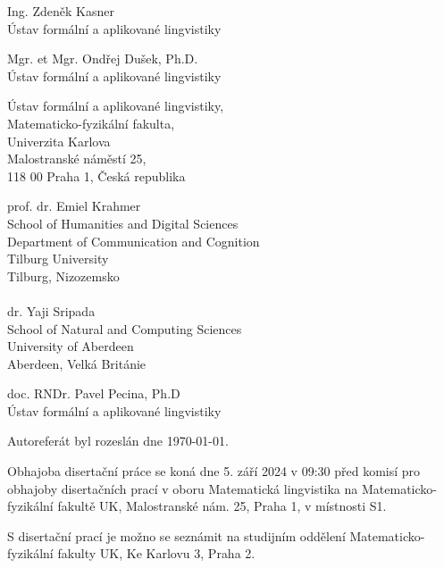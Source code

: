 \documentclass[12pt,notitlepage,a4paper,openright]{report}
\begin{document}
\begin{description}[leftmargin=15.5em,labelwidth=15.5em,labelindent=0em,labelsep=0em]
  \item[Doktorand:] Ing. Zdeněk Kasner\\Ústav formální a aplikované lingvistiky
  \item[Školitel:] Mgr. et Mgr. Ondřej Dušek, Ph.D.\\Ústav formální a aplikované lingvistiky
  \item[Školicí pracoviště:]  Ústav formální a aplikované lingvistiky,
    \\Matematicko-fyzikální fakulta,
    \\Univerzita Karlova
    \\Malostranské náměstí 25,
    \\118 00 Praha 1, Česká republika

  \item[Oponenti:] prof. dr. Emiel Krahmer\\School of Humanities and Digital Sciences\\Department of Communication and Cognition\\Tilburg University\\Tilburg, Nizozemsko\\ \\ dr. Yaji Sripada\\ School of Natural and Computing Sciences\\University of Aberdeen\\Aberdeen, Velká Británie

  \item[Předseda RDSO:] doc. RNDr. Pavel Pecina, Ph.D\\Ústav formální a aplikované lingvistiky
\end{description}

\vfill

\noindent Autoreferát byl rozeslán dne \today.

\vspace{0.5cm}

\noindent Obhajoba disertační práce se koná dne 5. září 2024 v 09:30 před komisí pro obhajoby disertačních prací v oboru Matematická lingvistika na Matematicko-fyzikální fakultě UK, Malostranské nám. 25, Praha 1, v místnosti S1.

\vspace{0.5cm}

\noindent S disertační prací je možno se seznámit na studijním oddělení Matematicko-fyzikální fakulty UK, Ke Karlovu 3, Praha 2.
\end{document}
